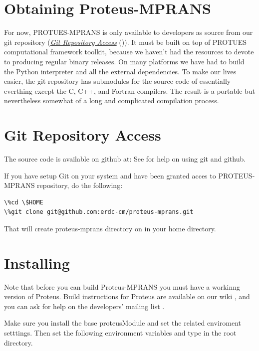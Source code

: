 \documentclass[letterpaper,12pt,english]{sphinxmanual}
\begin{document}
\chapter{Obtaining Proteus-MPRANS}
\label{index:obtaining-sec}\label{index:obtaining-proteus-mprans}
For now, PROTUES-MPRANS is only available to developers as source from our
git repository ({\hyperref[index:git-sec]{\emph{Git Repository Access}}} ()). It must be built on top of PROTUES
computational framework toolkit, because we haven't had the resources
to devote to producing regular binary releases. On many platforms we
have had to build the Python interpreter and all the external
dependencies. To make our lives easier, the git repository has
submodules for the source code of essentially everthing except the C,
C++, and Fortran compilers. The result is a portable but nevertheless
somewhat of a long and complicated compilation process.


\chapter{Git Repository Access}
\label{index:git-repository-access}\label{index:git-sec}
The source code is available on github at: 
See  for help on using git and github.

If you have setup Git on your system and have been granted acces to PROTEUS-MPRANS
repository, do the following:

\begin{Verbatim}[commandchars=\\\{\}]
\%cd \$HOME
\%git clone git@github.com:erdc-cm/proteus-mprans.git
\end{Verbatim}

That will create proteus-mprans directory on in your home directory.


\chapter{Installing}
\label{index:installing-sec}\label{index:installing}
Note that before you can build Proteus-MPRANS you must have a workinng version
of Proteus. Build instructions for Proteus are available on our wiki
, and you can ask for help on
the developers' mailing list
.

Make sure you install the base proteusModule and set the related enviroment setttings.
Then set the following environment variables and type  in the root directory.
\end{document}
